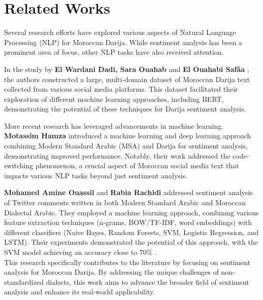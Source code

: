 \documentclass[a4paper,40pt,twocolumn]{article}
\begin{document}
\section{Related Works}
Several research efforts have explored various aspects of Natural Language Processing (NLP) for Moroccan Darija. While sentiment analysis has been a prominent area of focus, other NLP tasks have also received attention.

In the study by \textbf{El Wardani Dadi, Sara Ouahab }and \textbf{El Ouahabi Safâa}  \cite{dar1}, the authors constructed a large, multi-domain dataset of Moroccan Darija text collected from various social media platforms. This dataset facilitated their exploration of different machine learning approaches, including BERT, demonstrating the potential of these techniques for Darija sentiment analysis.

More recent research has leveraged advancements in machine learning. \textbf{Motassim Hamza}\cite{dar2} introduced a machine learning and  deep learning approach combining Modern Standard Arabic (MSA) and Darija for sentiment analysis, demonstrating improved performance. Notably, their work addressed the code-switching phenomenon, a crucial aspect of Moroccan social media text that impacts various NLP tasks beyond just sentiment analysis.

\textbf{Mohamed Amine Ouassil} and \textbf{Rabia Rachidi} \cite{dar3} addressed sentiment analysis of Twitter comments written in both Modern Standard Arabic and Moroccan Dialectal Arabic. They employed a machine learning approach, combining various feature extraction techniques (n-grams, BOW/TF-IDF, word embeddings) with different classifiers (Naive Bayes, Random Forests, SVM, Logistic Regression, and LSTM). Their experiments demonstrated the potential of this approach, with the SVM model achieving an accuracy close to 70\% .\\

This research specifically contributes to the literature by focusing on sentiment analysis for Moroccan Darija. By addressing the unique challenges of non-standardized dialects, this work aims to advance the broader field of sentiment analysis and enhance its real-world applicability.
\end{document}
